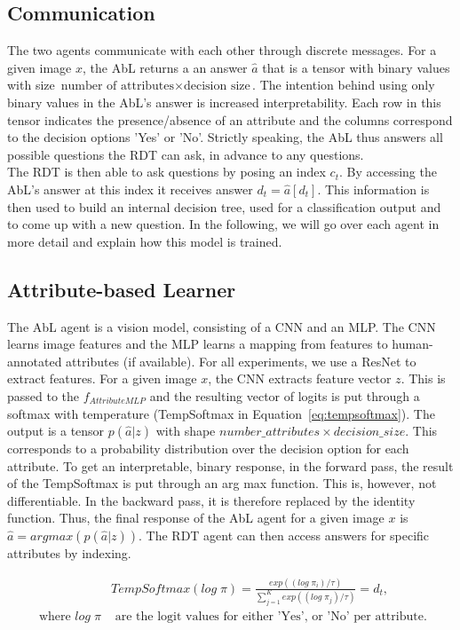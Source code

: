 \documentclass[a4paper,cleardoubleempty,BCOR1cm, 11pt]{report}
\begin{document}
\subsection{Communication}
The two agents communicate with each other through discrete messages. For a given image $x$, the AbL returns a an answer $\hat{a}$ that is a tensor with binary values with size $\text{number of attributes} \times \text{decision size}$. The intention behind using only binary values in the AbL's answer is increased interpretability. Each row in this tensor indicates the presence/absence of an attribute and the columns correspond to the decision options 'Yes' or 'No'. Strictly speaking, the AbL thus answers all possible questions the RDT can ask, in advance to any questions.\\
The RDT is then able to ask questions by posing an index $c_t$. By accessing the AbL's answer at this index it receives answer $d_t = \hat{a}[d_t]$. This information is then used to build an internal decision tree, used for a classification output and to come up with a new question. In the following, we will go over each agent in more detail and explain how this model is trained.


\subsection{Attribute-based Learner}
The AbL agent is a vision model, consisting of a CNN and an MLP. The CNN learns image features and the MLP learns a mapping from features to human-annotated attributes (if available). For all experiments, we use a ResNet \cite{he2016deep} to extract features. For a given image $x$, the CNN extracts feature vector $z$. This is passed to the $f_{AttributeMLP}$ and the resulting vector of logits is put through a softmax with temperature (TempSoftmax in Equation~\ref{eq:tempsoftmax}). The output is a tensor $p(\hat{a}|z)$ with shape $number\_attributes \times decision\_size$. This corresponds to a probability distribution over the decision option for each attribute. To get an interpretable, binary response, in the forward pass, the result of the TempSoftmax is put through an arg max function. This is, however, not differentiable. In the backward pass, it is therefore replaced by the identity function. Thus, the final response of the AbL agent for a given image $x$ is $\hat{a} = argmax(p(\hat{a}|z))$. The RDT agent can then access answers for specific attributes by indexing.

\begin{align}\label{eq:tempsoftmax}
&TempSoftmax(log\;\pi) = \frac{exp((log\;\pi_i)/\tau)}{\sum_{j=1}^{K}exp((log\;\pi_j)/\tau)} = d_t,\\
\text{ where }
log\;\pi &\text{ are the logit values for either 'Yes', or 'No' per attribute.}%
\end{align}
\end{document}
